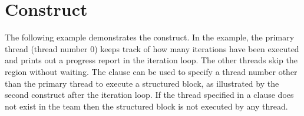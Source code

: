 \pagebreak
\section{ Construct}
\label{sec:masked}

The following example demonstrates the  construct. 
In the example, the primary thread (thread number 0) 
keeps track of how many iterations have been executed and prints out 
a progress report in the iteration loop.
The other threads skip the  region without waiting. 
The  clause can be used to specify a thread number other 
than the primary thread to execute a structured block, as illustrated by
the second  construct after the iteration loop.
If the thread specified in a  clause does not exist 
in the team then the structured block is not executed by any thread.




